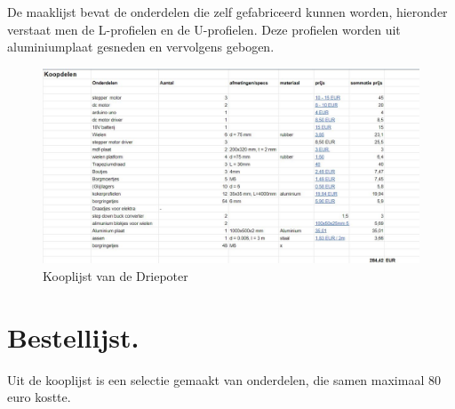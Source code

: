 De maaklijst bevat de onderdelen die zelf gefabriceerd kunnen worden, hieronder verstaat men de L-profielen en de U-profielen. Deze profielen worden uit aluminiumplaat gesneden en vervolgens gebogen. 

\vspace{\baselineskip}
\begin{figure}[H]
    \includegraphics[width = 120mm]{04_conceptdimensionering/Tabel_Kooplijst.JPG}
    \caption{Kooplijst van de Driepoter}
    \label{fig:kooplijst}
\end{figure}

\section{Bestellijst.}
Uit de kooplijst is een selectie gemaakt van onderdelen, die samen maximaal 80 euro kostte. 